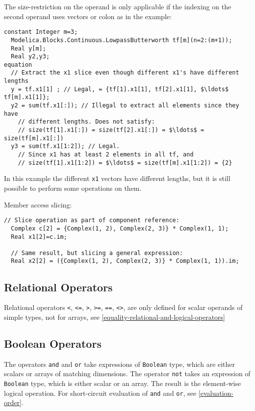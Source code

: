\begin{example}
The size-restriction on the operand is only applicable if the indexing on the second operand uses vectors or colon as in the example:
\begin{lstlisting}[language=modelica]
  constant Integer m=3;
  Modelica.Blocks.Continuous.LowpassButterworth tf[m](n=2:(m+1));
  Real y[m];
  Real y2,y3;
equation
  // Extract the x1 slice even though different x1's have different lengths
  y = tf.x1[1] ; // Legal, = {tf[1].x1[1], tf[2].x1[1], $\ldots$ tf[m].x1[1]};
  y2 = sum(tf.x1[:]); // Illegal to extract all elements since they have
    // different lengths. Does not satisfy:
    // size(tf[1].x1[:]) = size(tf[2].x1[:]) = $\ldots$ = size(tf[m].x1[:])
  y3 = sum(tf.x1[1:2]); // Legal.
    // Since x1 has at least 2 elements in all tf, and
    // size(tf[1].x1[1:2]) = $\ldots$ = size(tf[m].x1[1:2]) = {2}
\end{lstlisting}
In this example the different \lstinline!x1! vectors have different lengths,
but it is still possible to perform some operations on them.
\end{example}

\begin{example}
Member access slicing:
\begin{lstlisting}[language=modelica]
  // Slice operation as part of component reference:
  Complex c[2] = {Complex(1, 2), Complex(2, 3)} * Complex(1, 1);
  Real x1[2]=c.im;

  // Same result, but slicing a general expression:
  Real x2[2] = ({Complex(1, 2), Complex(2, 3)} * Complex(1, 1)).im;
\end{lstlisting}
\end{example}

\subsection{Relational Operators}\label{relational-operators}

Relational operators \lstinline!<!, \lstinline!<=!, \lstinline!>!,
\lstinline!>=!, \lstinline!==!, \lstinline!<>!, are only defined for
scalar operands of simple types, not for arrays, see \cref{equality-relational-and-logical-operators}

\subsection{Boolean Operators}\label{boolean-operators}

The operators \lstinline!and! and \lstinline!or! take expressions of \lstinline!Boolean! type, which are either scalars or arrays of matching dimensions.  The operator \lstinline!not!
takes an expression of \lstinline!Boolean! type, which is either scalar or an array.  The result is the element-wise logical operation.  For short-circuit evaluation of \lstinline!and!
and \lstinline!or!, see \cref{evaluation-order}.

